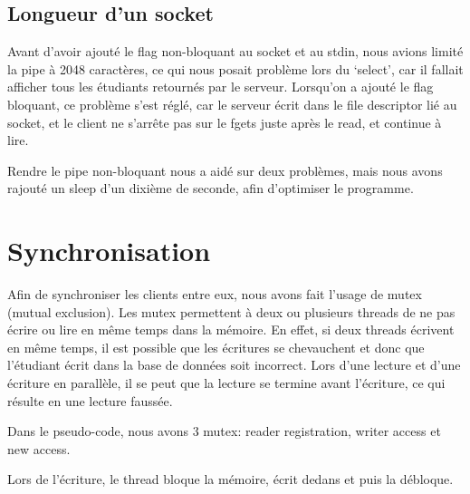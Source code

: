 \documentclass[utf8]{article}
\begin{document}
\begin{large}
\subsection{Longueur d'un socket}
\par
\indent

Avant d'avoir ajouté le flag non-bloquant au socket et au stdin, nous avions
limité la pipe à 2048 caractères, ce qui nous posait problème lors du `select',
car il fallait afficher tous les étudiants retournés par le serveur. Lorsqu'on a
ajouté le flag bloquant, ce problème s'est réglé, car le serveur écrit dans le
file descriptor lié au socket, et le client ne s'arrête pas sur le fgets juste
après le read, et continue à lire.
\par
Rendre le pipe non-bloquant nous a aidé sur deux problèmes, mais nous avons
rajouté un sleep d'un dixième de seconde, afin d'optimiser le programme.
\par

\section{Synchronisation}
\par
\indent

Afin de synchroniser les clients entre eux, nous avons fait l'usage de
mutex (mutual exclusion). Les mutex permettent à deux ou plusieurs threads de ne
pas écrire ou lire en même temps dans la mémoire. En effet, si deux threads
écrivent en même temps, il est possible que les écritures se chevauchent et donc
que l'étudiant écrit dans la base de données soit incorrect. Lors d'une lecture
et d'une écriture en parallèle, il se peut que la lecture se termine avant
l'écriture, ce qui résulte en une lecture faussée.
\par
Dans le pseudo-code, nous avons 3 mutex: reader registration, writer access et
new access. 
\par

Lors de l'écriture, le thread bloque la mémoire, écrit dedans et puis la débloque.


\end{large}
\end{document}
